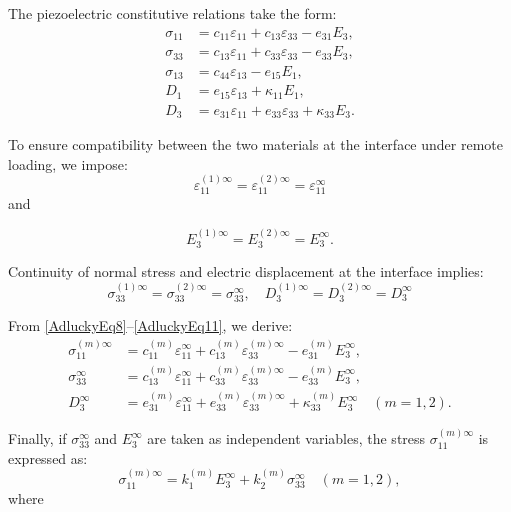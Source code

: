 The piezoelectric constitutive relations take the form:
\begin{equation}
    \begin{array}{ll}
	\sigma_{11} &= c_{11} \varepsilon_{11} + c_{13} \varepsilon_{33} - e_{31} E_3, \\
	\sigma_{33} &= c_{13} \varepsilon_{11} + c_{33} \varepsilon_{33} - e_{33} E_3, \\
	\sigma_{13} &= c_{44} \varepsilon_{13} - e_{15} E_1,
    \\
	D_1 &= e_{15} \varepsilon_{13} + \kappa_{11} E_1,
    \\
	D_3 &= e_{31} \varepsilon_{11} + e_{33} \varepsilon_{33} + \kappa_{33} E_3.
\end{array}
 \label{AdluckyEq8}
\end{equation}

To ensure compatibility between the two materials at the interface under remote loading, we impose:
\begin{equation}
	\varepsilon_{11}^{(1)\infty} = \varepsilon_{11}^{(2)\infty} = \varepsilon_{11}^{\infty}
	\label{AdluckyEq9}
\end{equation}
and

\begin{equation}
	E_3^{(1)\infty} = E_3^{(2)\infty} = E_3^{\infty}.
	\label{AdluckyEq10}
\end{equation}

Continuity of normal stress and electric displacement at the interface implies:
\begin{equation}
	\sigma_{33}^{(1)\infty} = \sigma_{33}^{(2)\infty} = \sigma_{33}^{\infty}, \quad
	D_3^{(1)\infty} = D_3^{(2)\infty} = D_3^{\infty}
	\label{AdluckyEq11}
\end{equation}

From \eqref{AdluckyEq8}–\eqref{AdluckyEq11}, we derive:
\begin{align}
	\sigma_{11}^{(m)\infty} &= c_{11}^{(m)} \varepsilon_{11}^{\infty} + c_{13}^{(m)} \varepsilon_{33}^{(m)\infty} - e_{31}^{(m)} E_3^{\infty}, \nonumber \\
	\sigma_{33}^{\infty} &= c_{13}^{(m)} \varepsilon_{11}^{\infty} + c_{33}^{(m)} \varepsilon_{33}^{(m)\infty} - e_{33}^{(m)} E_3^{\infty}, \label{AdluckyEq12} \\
	D_3^{\infty} &= e_{31}^{(m)} \varepsilon_{11}^{\infty} + e_{33}^{(m)} \varepsilon_{33}^{(m)\infty} + \kappa_{33}^{(m)} E_3^{\infty} \quad (m = 1,2). \nonumber
\end{align}

Finally, if $\sigma_{33}^{\infty}$ and $E_3^{\infty}$ are taken as independent variables, the stress $\sigma_{11}^{(m)\infty}$ is expressed as:
\begin{equation}
	\sigma_{11}^{(m)\infty} = k_1^{(m)} E_3^{\infty} + k_2^{(m)} \sigma_{33}^{\infty} \quad (m = 1,2),
	\label{AdluckyEq13}
\end{equation}
where

